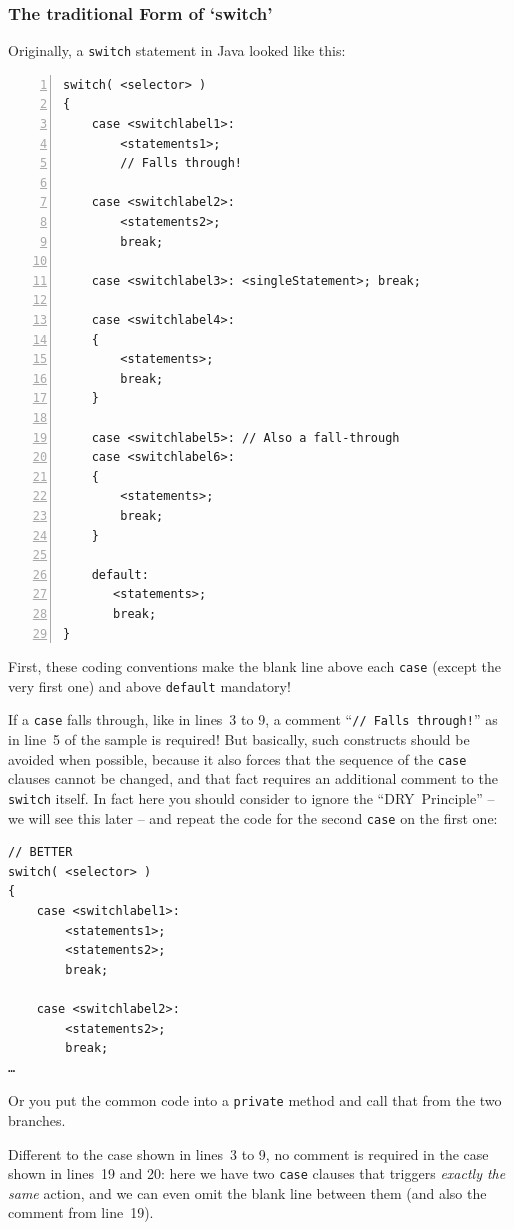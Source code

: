 \documentclass[11pt,a4paper, titlepage, parskip=half, headsepline, footsepline, cleardoublepage=current, headheight=1cm]{scrbook}
\begin{document}
\subsubsection{The traditional Form of ‘switch’}
Originally, a \lstinline|switch| statement in Java looked like this:
\begin{lstlisting}[numbers=left]
switch( <selector> )
{
    case <switchlabel1>:
        <statements1>;
        // Falls through!

    case <switchlabel2>:
        <statements2>;
        break;

    case <switchlabel3>: <singleStatement>; break;

    case <switchlabel4>:
    {
        <statements>;
        break;
    }

    case <switchlabel5>: // Also a fall-through
    case <switchlabel6>:
    {
        <statements>;
        break;
    }

    default:
       <statements>;
       break;
}
\end{lstlisting}

First, these coding conventions make the blank line above each \lstinline|case| (except the very first one) and above \lstinline|default| mandatory!
  
If a \lstinline|case| falls through, like in lines~3 to 9, a comment “\lstinline|// Falls through!|” as in line~5 of the sample is required! But basically, such constructs should be avoided when possible, because it also forces that the sequence of the \lstinline|case| clauses cannot be changed, and that fact requires an additional comment to the \lstinline|switch| itself. In fact here you should consider to ignore the “DRY~Principle” – we will see this later – and repeat the code for the second \lstinline|case| on the first one:
\begin{lstlisting}
// BETTER
switch( <selector> )
{
    case <switchlabel1>:
        <statements1>;
        <statements2>;
        break;

    case <switchlabel2>:
        <statements2>;
        break;
…
\end{lstlisting}
Or you put the common code into a \lstinline|private| method and call that from the two branches. 

Different to the case shown in lines~3 to 9, no comment is required in the case shown in lines~19 and 20: here we have two \lstinline|case| clauses that triggers \textit{exactly the same} action, and we can even omit the blank line between them (and also the comment from line~19).
\end{document}
